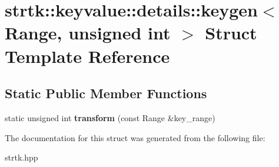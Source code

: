 \hypertarget{structstrtk_1_1keyvalue_1_1details_1_1keygen_3_01Range_00_01unsigned_01int_01_4}{\section{strtk\-:\-:keyvalue\-:\-:details\-:\-:keygen$<$ Range, unsigned int $>$ Struct Template Reference}
\label{structstrtk_1_1keyvalue_1_1details_1_1keygen_3_01Range_00_01unsigned_01int_01_4}
}
\subsection*{Static Public Member Functions}
\begin{DoxyCompactItemize}
\item 
\hypertarget{structstrtk_1_1keyvalue_1_1details_1_1keygen_3_01Range_00_01unsigned_01int_01_4_a1afe075ad15bae6f23e8dac1a8093afd}{static unsigned int {\bfseries transform} (const Range \&key\-\_\-range)}\label{structstrtk_1_1keyvalue_1_1details_1_1keygen_3_01Range_00_01unsigned_01int_01_4_a1afe075ad15bae6f23e8dac1a8093afd}

\end{DoxyCompactItemize}


The documentation for this struct was generated from the following file\-:\begin{DoxyCompactItemize}
\item 
strtk.\-hpp\end{DoxyCompactItemize}
